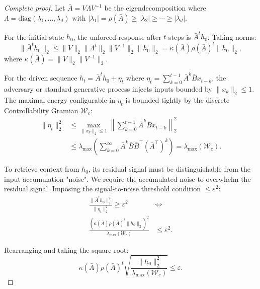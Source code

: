 \documentclass[10pt,twocolumn]{article}
\begin{document}
\begin{proof}[Complete proof]
Let $\bar{A} = V \Lambda V^{-1}$ be the eigendecomposition where $\Lambda = \text{diag}(\lambda_1, \dots, \lambda_d)$ with $|\lambda_1| = \rho(\bar{A}) \ge |\lambda_2| \ge \cdots \ge |\lambda_d|$. 

For the initial state $h_0$, the unforced response after $t$ steps is $\bar{A}^t h_0$. Taking norms:
\begin{equation}
\|\bar{A}^t h_0\|_2 \le \|V\|_2 \|\Lambda^t\|_2 \|V^{-1}\|_2 \|h_0\|_2 = \kappa(\bar{A}) \rho(\bar{A})^t \|h_0\|_2,
\end{equation}
where $\kappa(\bar{A}) = \|V\|_2 \|V^{-1}\|_2$.

For the driven sequence $h_t = \bar{A}^t h_0 + \eta_t$ where $\eta_t = \sum_{k=0}^{t-1} \bar{A}^k \bar{B} x_{t-k}$, the adversary or standard generative process injects inputs bounded by $\|x_k\|_2 \le 1$. The maximal energy configurable in $\eta_t$ is bounded tightly by the discrete Controllability Gramian $\mathcal{W}_c$:
\begin{equation}
\begin{aligned}
\|\eta_t\|_2^2 &\le \max_{\|x_k\|_2 \le 1} \left\| \sum_{k=0}^{t-1} \bar{A}^k \bar{B} x_{t-k} \right\|_2^2 \\
&\le \lambda_{\max}\left( \sum_{k=0}^{\infty} \bar{A}^k \bar{B} \bar{B}^\top (\bar{A}^\top)^k \right) = \lambda_{\max}(\mathcal{W}_c).
\end{aligned}
\end{equation}

To retrieve context from $h_0$, its residual signal must be distinguishable from the input accumulation "noise". We require the accumulated noise to overwhelm the residual signal. Imposing the signal-to-noise threshold condition $\le \varepsilon^2$:
\begin{equation}
\begin{aligned}
\frac{\|\bar{A}^t h_0\|_2^2}{\|\eta_t\|_2^2} \ge \varepsilon^2 &\iff \\
\frac{(\kappa(\bar{A}) \rho(\bar{A})^t \|h_0\|_2)^2}{\lambda_{\max}(\mathcal{W}_c)} &\le \varepsilon^2.
\end{aligned}
\end{equation}

Rearranging and taking the square root:
\begin{equation}
\kappa(\bar{A}) \rho(\bar{A})^t \sqrt{ \frac{\|h_0\|_2^2}{\lambda_{\max}(\mathcal{W}_c)} } \le \varepsilon.
\end{equation}


\end{proof}
\end{document}
